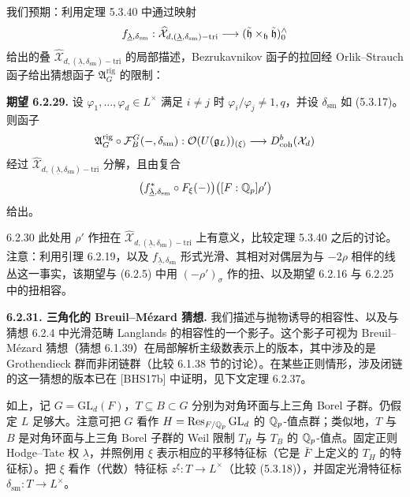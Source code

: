 我们预期：利用定理 5.3.40 中通过映射
\[
f_{\underline\lambda,\delta_{\mathrm{sm}}}:
\widehat{\mathcal X}_{d,(\underline\lambda,\delta_{\mathrm{sm}})-\mathrm{tri}}
\longrightarrow(\tilde{\mathfrak h}\times_{\mathfrak h}\tilde{\mathfrak h})^{\wedge}_0
\]
给出的叠 $\widehat{\mathcal X}_{d,(\underline\lambda,\delta_{\mathrm{sm}})-\mathrm{tri}}$ 的局部描述，Bezrukavnikov 函子的拉回经 Orlik--Strauch 函子给出猜想函子 $\mathfrak A_G^{\mathrm{rig}}$ 的限制：

\medskip\noindent\textbf{期望 6.2.29.}\label{exp:a4-6-2-29}
设 $\varphi_1,\dots,\varphi_d\in L^\times$ 满足 $i\neq j$ 时 $\varphi_i/\varphi_j\neq1,q$，并设 $\delta_{\mathrm{sm}}$ 如 (5.3.17)。则函子
\[
\mathfrak A_G^{\mathrm{rig}}\circ\mathcal F_B^G(-,\delta_{\mathrm{sm}}):
\mathcal O(U(\mathfrak g_L))_{(\xi)}\longrightarrow D^b_{\mathrm{coh}}(\mathcal X_d)
\]
经过 $\widehat{\mathcal X}_{d,(\underline\lambda,\delta_{\mathrm{sm}})-\mathrm{tri}}$ 分解，且由复合
\[
\bigl(f^{*}_{\underline\lambda,\delta_{\mathrm{sm}}}\circ F_\xi(-)\bigr)\bigl([F:\mathbb{Q}_p]\rho'\bigr)
\]
给出。

\begin{rem}{6.2.30}\label{rem:a4-6-2-30}
此处用 $\rho'$ 作扭在 $\widehat{\mathcal X}_{d,(\underline\lambda,\delta_{\mathrm{sm}})-\mathrm{tri}}$ 上有意义，比较定理 5.3.40 之后的讨论。注意：利用引理 6.2.19，以及 $f_{\underline\lambda,\delta_{\mathrm{sm}}}$ 形式光滑、其相对对偶层为与 $-2\rho$ 相伴的线丛这一事实，该期望与 (6.2.5) 中用 $(-\rho')_\sigma$ 作的扭、以及期望 6.2.16 与 6.2.25 中的扭相容。
\end{rem}

\medskip\noindent\textbf{6.2.31. 三角化的 Breuil--Mézard 猜想.}
我们描述与抛物诱导的相容性、以及与猜想 6.2.4 中光滑范畴 Langlands 的相容性的一个影子。这个影子可视为 Breuil--Mézard 猜想（猜想 6.1.39）在局部解析主级数表示上的版本，其中涉及的是 Grothendieck 群而非闭链群（比较 6.1.38 节的讨论）。在某些正则情形，涉及闭链的这一猜想的版本已在 [BHS17b] 中证明，见下文定理 6.2.37。

如上，记 $G=\mathrm{GL}_d(F)$，$T\subseteq B\subset G$ 分别为对角环面与上三角 Borel 子群。仍假定 $L$ 足够大。注意可把 $G$ 看作 $H=\operatorname{Res}_{F/\mathbb{Q}_p}\mathrm{GL}_d$ 的 $\mathbb{Q}_p$-值点群；类似地，$T$ 与 $B$ 是对角环面与上三角 Borel 子群的 Weil 限制 $T_H$ 与 $T_B$ 的 $\mathbb{Q}_p$-值点。固定正则 Hodge--Tate 权 $\underline\lambda$，并照例用 $\xi$ 表示相应的平移特征标（它是 $\bar F$ 上定义的 $T_H$ 的特征标）。把 $\xi$ 看作（代数）特征标 $z^\xi:T\to L^\times$（比较 (5.3.18)），并固定光滑特征标 $\delta_{\mathrm{sm}}:T\to L^\times$。

